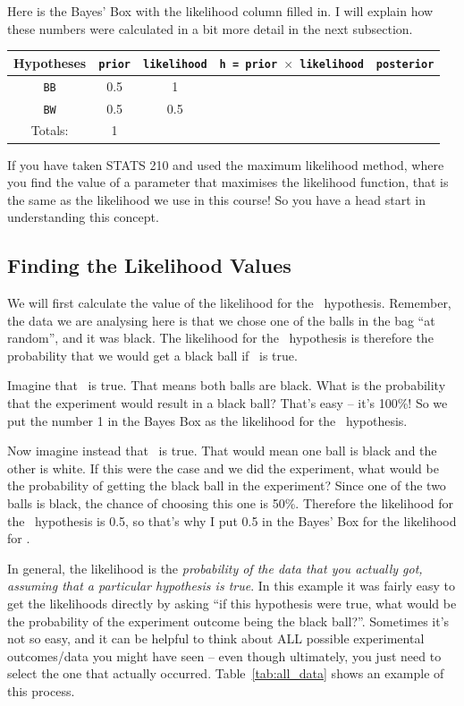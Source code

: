Here is the Bayes' Box with the likelihood column filled in. I will explain
how these numbers were calculated in a bit more detail in the next subsection.
\begin{table}[h!]
\begin{center}
\begin{tabular}{|c|c|c|c|c|}
\hline
{\bf Hypotheses} & {\tt prior} & {\tt likelihood} &
{\tt h = prior $\times$ likelihood} & {\tt posterior}\\
\hline
{\tt BB} & 0.5 & 1 &  & \\
{\tt BW} & 0.5 & 0.5 &  & \\
\hline
Totals: & 1 & & & \\
\hline
\end{tabular}
\end{center}
\end{table}
If you have taken STATS 210 and used the maximum likelihood method, where you
find the value of a parameter that maximises the likelihood function, that is
the same as the likelihood we use in this course! So you have a head start
in understanding this concept.

\subsection{Finding the Likelihood Values}
We will first calculate the value of the likelihood for the \bb~hypothesis.
Remember, the data we are analysing here is that we chose one of the balls in
the bag ``at random'', and it was black. The likelihood for the \bb~hypothesis is
therefore the probability that we would get a black ball if \bb~is true.

Imagine that \bb~is true. That means both balls are black. What is the probability that
the experiment would result in a black ball? That's easy -- it's 100\%! So we
put the number 1 in the Bayes Box as the likelihood for the \bb~hypothesis.

Now imagine instead that \bw~is true. That would mean one ball is black and the
other is white. If this were the case and we did the experiment, what would be
the probability of getting the black ball in the experiment? Since one of the
two balls is black, the chance of choosing this one is 50\%. Therefore the
likelihood for the \bw~hypothesis is 0.5, so that's why I put 0.5 in the Bayes'
Box for the likelihood for \bw.

In general, the likelihood is the {\it probability of the data that you actually
got, assuming that a particular hypothesis is true}. In this example it was
fairly easy to get the likelihoods directly by asking ``if this hypothesis
were true, what would be the probability of the experiment outcome being the
black ball?''. Sometimes it's not so easy, and it can be helpful to think about
ALL possible experimental outcomes/data you might have seen -- even though
ultimately, you just need to select the one that actually occurred.
Table~\ref{tab:all_data} shows an example of this process.

